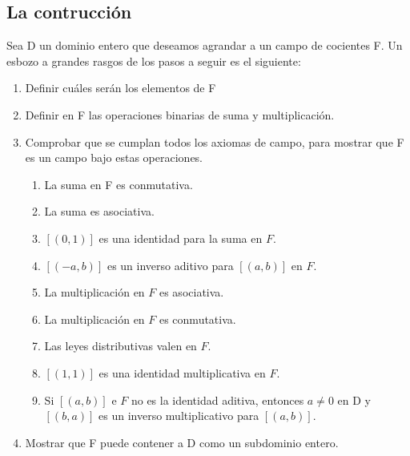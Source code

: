 \subsection*{La contrucción}
Sea D un dominio entero que deseamos agrandar a un campo de cocientes F. Un esbozo a grandes rasgos de los pasos a seguir es el siguiente:
\begin{enumerate}
	\item Definir cuáles serán los elementos de F
	\item  Definir en F las operaciones binarias de suma y multiplicación.
	\item Comprobar que se cumplan todos los axiomas de campo, para mostrar que F es un campo bajo estas operaciones.
	\begin{enumerate}
		\item La suma en F es conmutativa.
		\item La suma es asociativa.
		\item $[(0, 1)]$ es una identidad para la suma en $F$.
		\item $[(-a, b)]$ es un inverso aditivo para $[(a, b)]$ en $F$.
		\item La multiplicación en $F$ es asociativa.
		\item La multiplicación en $F$ es conmutativa.
		\item Las leyes distributivas valen en $F$.
		\item $[(1, 1)]$ es una identidad multiplicativa en $F$.
		\item Si $[(a, b)]$ e $F$ no es la identidad aditiva, entonces $a \not= 0 $ en D y $[(b, a)]$ es
		un inverso multiplicativo para $[(a, b)]$.
	\end{enumerate}
	\item Mostrar que F puede contener a D como un subdominio entero.
\end{enumerate}
